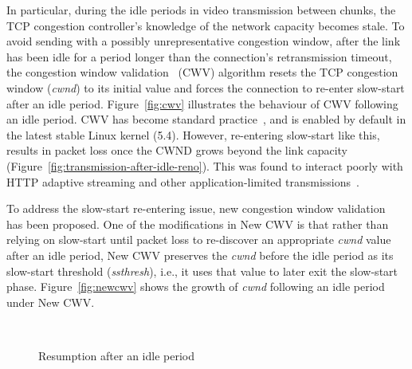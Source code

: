 \documentclass[10pt,sigconf]{acmart}
\begin{document}
In particular, during the idle periods in video transmission between chunks, the TCP congestion controller's knowledge of the network capacity becomes stale. To avoid sending with a possibly unrepresentative congestion window, after the link has been idle for a period longer than the connection's retransmission timeout, the congestion window validation~\cite{rfc2861-2000-padhye-congestion-window-validation} (CWV) algorithm resets the TCP congestion window (\emph{cwnd}) to its initial value and forces the connection to re-enter slow-start after an idle period. Figure~\ref{fig:cwv} illustrates the behaviour of CWV following an idle period. CWV has become standard practice~\cite{rfc5681-congeston-control}, and is enabled by default in the latest stable Linux kernel (5.4). However, re-entering slow-start like this, results in packet loss once the CWND grows beyond the link capacity (Figure~\ref{fig:transmission-after-idle-reno}). This was found to interact poorly with HTTP adaptive streaming and other application-limited transmissions~\cite{Esteban-2012-Interactions-HTTP-TCP}.

To address the slow-start re-entering issue, new congestion window validation~\cite{rfc7661-2015-fairhurst-new-cwnd-validation} has been proposed. One of the modifications in New CWV is that rather than relying on slow-start until packet loss to re-discover an appropriate \emph{cwnd} value after an idle period, New CWV preserves the \emph{cwnd} before the idle period as its slow-start threshold (\emph{ssthresh}), i.e., it uses that value to later exit the slow-start phase. Figure~\ref{fig:newcwv} shows the growth of \emph{cwnd} following an idle period under New CWV.

\begin{figure}[t!]
  \centering
  \\
    \caption{Resumption after an idle period}
    \label{fig:transmission-after-idle}
\end{figure}
\end{document}

